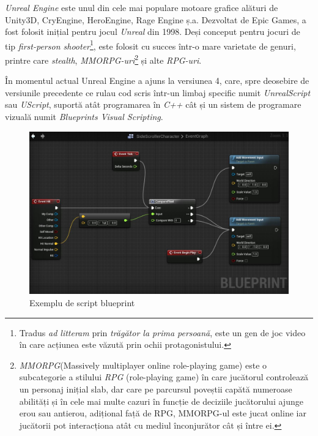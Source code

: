 \textit{Unreal Engine} este unul din cele mai populare motoare grafice alături de Unity3D, CryEngine, HeroEngine, Rage Engine ș.a.
Dezvoltat de Epic Games, a fost folosit inițial pentru jocul \textit{Unreal} din 1998. Deși conceput pentru jocuri de tip \textit{first-person shooter}\footnote{Tradus \textit{ad litteram} prin \textit{trăgător la prima persoană}, este un gen de joc video în care acțiunea este văzută prin ochii protagonistului.}, este folosit cu succes într-o mare varietate de genuri, printre care \textit{stealth}, \textit{MMORPG-uri}\footnote{\textit{MMORPG}(Massively multiplayer online role-playing game) este o subcategorie a stilului \textit{RPG} (role-playing game) în care jucătorul controlează un personaj inițial slab, dar care pe parcursul poveștii capătă numeroase abilități și în cele mai multe cazuri în funcție de deciziile jucătorului ajunge erou sau antierou, adițional față de RPG, MMORPG-ul este jucat online iar jucătorii pot interacționa atât cu mediul înconjurător cât și între ei.} și alte \textit{RPG-uri}. 

În momentul actual Unreal Engine a ajuns la versiunea 4, care, spre deosebire de versiunile precedente ce rulau cod scris într-un limbaj specific numit \textit{UnrealScript} sau \textit{UScript}, suportă atât programarea în \textit{C++} cât și un sistem de programare vizuală numit \textit{Blueprints Visual Scripting}.

\begin{figure}[h]
  \centering
  \includegraphics[scale=0.45]{img/simpleBPexample.jpg}
  \caption{Exemplu de script blueprint}
\end{figure}
\newpage